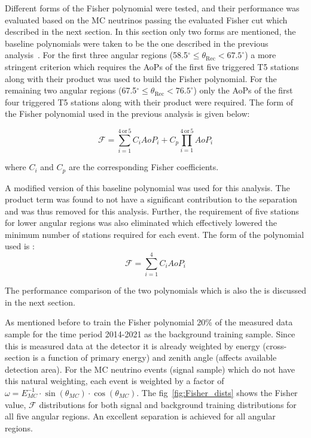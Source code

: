 Different forms of the Fisher polynomial were tested, and their performance was evaluated based on the MC neutrinos passing the evaluated Fisher cut which described in the next section. In this section only two forms are mentioned, the baseline polynomials were taken to be the one described in the previous analysis~\cite{gap_note_2013}. For the first three angular regions (58.5$^\circ \leq \theta_{\text{Rec}} < 67.5^\circ$) a more stringent criterion which requires the AoPs of the first five triggered T5 stations along with their product was used to build the Fisher polynomial. For the remaining two angular regions (67.5$^\circ \leq \theta_{\text{Rec}} < 76.5^\circ$) only the AoPs of the first four triggered T5 stations along with their product were required. The form of the Fisher polynomial used in the previous analysis is given below:

\begin{equation}
  \mathcal{F} = \sum_{i=1}^{4\,\text{or}\,5} C_i AoP_i + C_p \prod_{i=1}^{4\,\text{or}\,5} AoP_i
\end{equation}

where $C_i$ and $C_p$ are the corresponding Fisher coefficients. 

A modified version of this baseline polynomial was used for this analysis. The product term was found to not have a significant contribution to the separation and was thus removed for this analysis. Further, the requirement of five stations for lower angular regions was also eliminated which effectively lowered the minimum number of stations required for each event. The form of the polynomial used is : 
\begin{equation}
  \label{eq:fisher_poly_new}
  \mathcal{F} = \sum_{i=1}^{4} C_i AoP_i
\end{equation}

The performance comparison of the two polynomials which is also the is discussed in the next section.

As mentioned before to train the Fisher polynomial 20\% of the measured data sample for the time period 2014-2021 as the background training sample. Since this is measured data at the detector it is already weighted by energy (cross-section is a function of primary energy) and zenith angle (affects available detection area). For the MC neutrino events (signal sample) which do not have this natural weighting, each event is weighted by a factor of $\omega = E_{MC}^{-1} \cdot \sin(\theta_{MC}) \cdot \cos(\theta_{MC})$. The fig~\ref{fig:Fisher_dists} shows the Fisher value, $\mathcal{F}$ distributions for both signal and background training distributions for all five angular regions. An excellent separation is achieved for all angular regions. 

